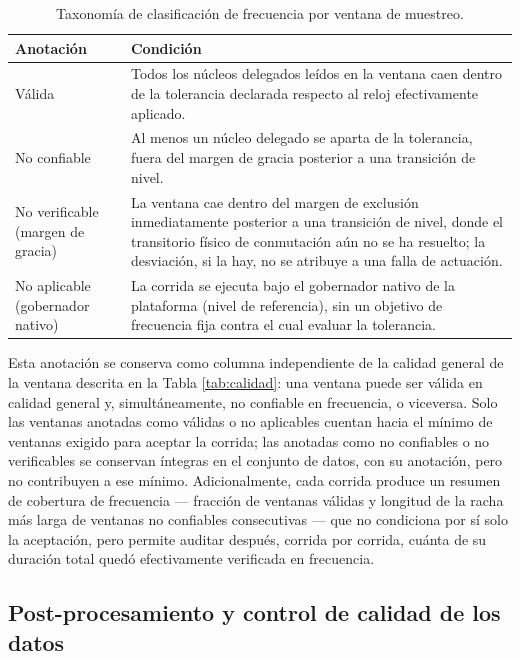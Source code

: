 \documentclass[12pt,oneside,spanish]{book}
\begin{document}
\begin{table}[H]
\centering
\caption{Taxonomía de clasificación de frecuencia por ventana de muestreo.}
\label{tab:frecuencia-clasificacion}
\begin{tabular}{@{}p{4.3cm}p{10.2cm}@{}}
\toprule
\textbf{Anotación} & \textbf{Condición} \\
\midrule
Válida & Todos los núcleos delegados leídos en la ventana caen dentro de la tolerancia declarada respecto al reloj efectivamente aplicado. \\
No confiable & Al menos un núcleo delegado se aparta de la tolerancia, fuera del margen de gracia posterior a una transición de nivel. \\
No verificable (margen de gracia) & La ventana cae dentro del margen de exclusión inmediatamente posterior a una transición de nivel, donde el transitorio físico de conmutación aún no se ha resuelto; la desviación, si la hay, no se atribuye a una falla de actuación. \\
No aplicable (gobernador nativo) & La corrida se ejecuta bajo el gobernador nativo de la plataforma (nivel de referencia), sin un objetivo de frecuencia fija contra el cual evaluar la tolerancia. \\
\bottomrule
\end{tabular}
\end{table}

Esta anotación se conserva como columna independiente de la calidad general de la ventana descrita en la Tabla \ref{tab:calidad}: una ventana puede ser válida en calidad general y, simultáneamente, no confiable en frecuencia, o viceversa. Solo las ventanas anotadas como válidas o no aplicables cuentan hacia el mínimo de ventanas exigido para aceptar la corrida; las anotadas como no confiables o no verificables se conservan íntegras en el conjunto de datos, con su anotación, pero no contribuyen a ese mínimo. Adicionalmente, cada corrida produce un resumen de cobertura de frecuencia --- fracción de ventanas válidas y longitud de la racha más larga de ventanas no confiables consecutivas --- que no condiciona por sí solo la aceptación, pero permite auditar después, corrida por corrida, cuánta de su duración total quedó efectivamente verificada en frecuencia.

\subsection{Post-procesamiento y control de calidad de los datos}
\end{document}
